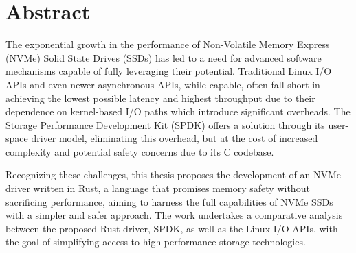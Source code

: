 \chapter{Abstract}
The exponential growth in the performance of Non-Volatile Memory Express (NVMe) Solid State Drives (SSDs) has led to a need for advanced software mechanisms capable of fully leveraging their potential. Traditional Linux I/O APIs and even newer asynchronous APIs, while capable, often fall short in achieving the lowest possible latency and highest throughput due to their dependence on kernel-based I/O paths which introduce significant overheads. The Storage Performance Development Kit (SPDK) offers a solution through its user-space driver model, eliminating this overhead, but at the cost of increased complexity and potential safety concerns due to its C codebase.

Recognizing these challenges, this thesis proposes the development of an NVMe driver written in Rust, a language that promises memory safety without sacrificing performance, aiming to harness the full capabilities of NVMe SSDs with a simpler and safer approach. The work undertakes a comparative analysis between the proposed Rust driver, SPDK, as well as the Linux I/O APIs, with the goal of simplifying access to high-performance storage technologies.

